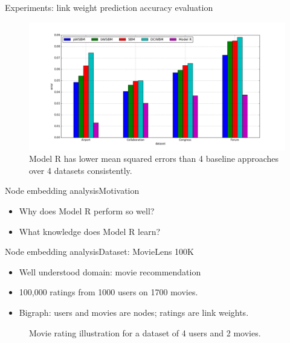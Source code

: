 \documentclass{beamer}
\begin{document}
\begin{frame}{Experiments: link weight prediction accuracy evaluation}
	\begin{figure}[H]\centering
		\includegraphics[width=\textwidth]{link-weight-errors}
		\caption{
			Model R has lower mean squared errors than 4 baseline approaches over 4 datasets consistently.
		}
		\label{fig:errors}
	\end{figure}
\end{frame}

\begin{frame}{Node embedding analysis}{Motivation}
	\begin{itemize}
		\item Why does Model R perform so well?
		\item What knowledge does Model R learn?
	\end{itemize}
\end{frame}

\begin{frame}{Node embedding analysis}{Dataset: MovieLens 100K}
	\begin{itemize}
		\item Well understood domain: movie recommendation
		\item 100,000 ratings from 1000 users on 1700 movies.
		\item Bigraph: users and movies are nodes; ratings are link weights.
	\end{itemize}
	\begin{figure}[H]\centering
		\caption{Movie rating illustration for a dataset of 4 users and 2 movies.}
		\label{fig:movie}
	\end{figure}
\end{frame}
\end{document}
